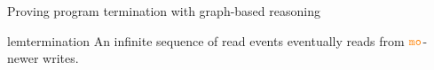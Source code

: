 \begin{frame}{Proving program termination with graph-based reasoning}
  \vspace{-0.5cm}
  \begin{center}
    

    \pause 
    \begin{restatable}{lem}{termination}
      An infinite sequence of read events eventually reads from $\lMO$-newer writes.
    \end{restatable}

  \end{center}

  \vspace{-1cm}
  
\end{frame}
